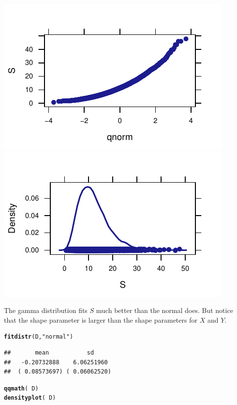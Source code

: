 \documentclass[twoside]{book}\usepackage[]{graphicx}\usepackage[]{xcolor}
\makeatletter
\def\maxwidth{ %
  \ifdim\Gin@nat@width>\linewidth
    \linewidth
  \else
    \Gin@nat@width
  \fi
}
\newcommand{\hlstr}[1]{\textcolor[rgb]{0.192,0.494,0.8}{#1}}%
\newcommand{\hlopt}[1]{\textcolor[rgb]{0,0,0}{#1}}%
\newcommand{\hlstd}[1]{\textcolor[rgb]{0.345,0.345,0.345}{#1}}%
\newcommand{\hlkwd}[1]{\textcolor[rgb]{0.737,0.353,0.396}{\textbf{#1}}}%
\newenvironment{kframe}{%
 \def\at@end@of@kframe{}%
 \ifinner\ifhmode%
  \def\at@end@of@kframe{\end{minipage}}%
  \begin{minipage}{\columnwidth}%
 \fi\fi%
 \def\FrameCommand##1{\hskip\@totalleftmargin \hskip-\fboxsep
 \colorbox{shadecolor}{##1}\hskip-\fboxsep
     \hskip-\linewidth \hskip-\@totalleftmargin \hskip\columnwidth}%
 \MakeFramed {\advance\hsize-\width
   \@totalleftmargin\z@ \linewidth\hsize
   \@setminipage}}%
 {\par\unskip\endMakeFramed%
 \at@end@of@kframe}
\newenvironment{knitrout}{}{} %
\makeatother
\begin{document}
\begin{solution}
\begin{knitrout}
{\centering \includegraphics[width=\maxwidth]{figures/fig-unnamed-chunk-136-1} 
\includegraphics[width=\maxwidth]{figures/fig-unnamed-chunk-136-2} 

}



\end{knitrout}
The gamma distribution fits $S$ much better than the normal does.  But notice that the 
shape parameter is larger than the shape parameters for $X$ and $Y$.

\begin{knitrout}
\color{fgcolor}\begin{kframe}
\begin{alltt}
\hlkwd{fitdistr}\hlstd{(D,} \hlstr{"normal"}\hlstd{)}
\end{alltt}
\begin{verbatim}
##       mean           sd     
##   -0.20732888    6.06251960 
##  ( 0.08573697) ( 0.06062520)
\end{verbatim}
\begin{alltt}
\hlkwd{qqmath}\hlstd{(}\hlopt{~}\hlstd{D)}
\hlkwd{densityplot}\hlstd{(}\hlopt{~}\hlstd{D)}
\end{alltt}
\end{kframe}


\end{knitrout}
\end{solution}
\end{document}
